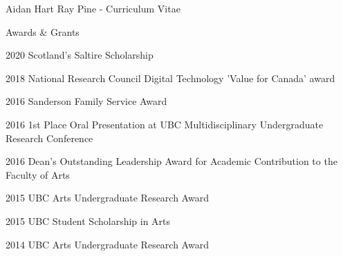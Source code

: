 \documentclass[12pt]{letter}
\begin{document}
\begin{cv}{ Aidan Hart Ray Pine  \space - \space   Curriculum Vitae}
        \begin{cvlist}{Awards \& Grants}
                        \item[2020] Scotland's Saltire Scholarship
                        \item[2018] National Research Council Digital Technology 'Value for Canada' award
                        \item[2016] Sanderson Family Service Award
                        \item[2016] 1st Place Oral Presentation at UBC Multidisciplinary Undergraduate Research Conference
                        \item[2016] Dean's Outstanding Leadership Award for Academic Contribution to the Faculty of Arts
                        \item[2015] UBC Arts Undergraduate Research Award
                        \item[2015] UBC Student Scholarship in Arts
                        \item[2014] UBC Arts Undergraduate Research Award
                    \end{cvlist}

    \end{cv}
    
    
\end{document}
